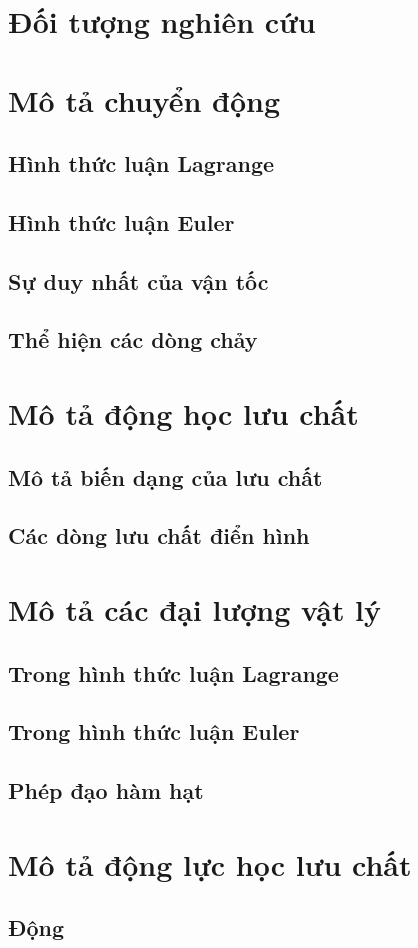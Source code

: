 \documentclass[../../main.tex]{subfiles}
\begin{document}
\section{Đối tượng nghiên cứu}
	
\section{Mô tả chuyển động}
	\subsection{Hình thức luận Lagrange}
		
	\subsection{Hình thức luận Euler}
		
	\subsection{Sự duy nhất của vận tốc}
		
	\subsection{Thể hiện các dòng chảy}
		
\section{Mô tả động học lưu chất}
	\subsection{Mô tả biến dạng của lưu chất}
		
	\subsection{Các dòng lưu chất điển hình}
		
\section{Mô tả các đại lượng vật lý}
	\subsection{Trong hình thức luận Lagrange}
		
	\subsection{Trong hình thức luận Euler}
		
	\subsection{Phép đạo hàm hạt}
		
\section{Mô tả động lực học lưu chất}
	\subsection{Động }
\end{document}
